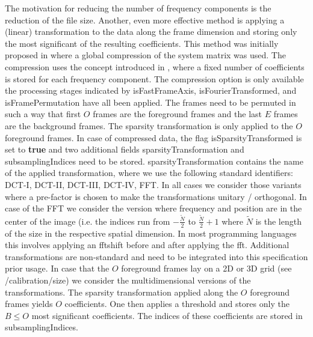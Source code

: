 \documentclass[landscape,a4paper]{article} %
\newcommand{\inltab}[1]{{\ttfamily\bfseries\color{blue}#1}}
\newcommand{\inlvar}[1]{{\ttfamily#1}}
\begin{document}
\begin{multicols}{2}
The motivation for reducing the number of frequency components is the reduction of the file size. Another, even more effective method is applying a (linear) transformation to the data along the frame dimension and storing only the most significant of the resulting coefficients. This method was initially proposed in \cite{lampe2012fast} where a global compression of the system matrix was used. The compression uses the concept introduced in \cite{knopp2015compression}, where a fixed number of coefficients is stored for each frequency component. The compression option is only available the processing stages indicated by \inlvar{isFastFrameAxis}, \inlvar{isFourierTransformed}, and \inlvar{isFramePermutation} have all been applied. The frames need to be permuted in such a way that first $O$ frames are the foreground frames and the last $E$ frames are the background frames. The sparsity transformation is only applied to the $O$ foreground frames. In case of compressed data, the flag \inlvar{isSparsityTransformed} is set to \inltab{true} and two additional fields \inlvar{sparsityTransformation} and \inlvar{subsamplingIndices} need to be stored. \inlvar{sparsityTransformation} contains the name of the applied transformation, where we use the following standard identifiers: DCT-I, DCT-II, DCT-III, DCT-IV, FFT. In all cases we consider those variants where a pre-factor is chosen to make the transformations unitary / orthogonal. In case of the FFT we consider the version where frequency and position are in the center of the image (i.e. the indices run from $-\frac{\tilde{N}}{2}$ to $\frac{\tilde{N}}{2}+1$ where $\tilde{N}$ is the length of the size in the respective spatial dimension. In most programming languages this involves applying an \inlvar{fftshift} before and after applying the \inlvar{fft}. Additional transformations are non-standard and need to be integrated into this specification prior usage. In case that the $O$ foreground frames lay on a 2D or 3D grid (see \inlvar{/calibration/size}) we consider the multidimensional versions of the transformations. The sparsity transformation applied along the $O$ foreground frames yields $O$ coefficients. One then applies a threshold and stores only the $B\leq O$ most significant coefficients. The indices of these coefficients are stored in \inlvar{subsamplingIndices}.

\end{multicols}
\end{document}
